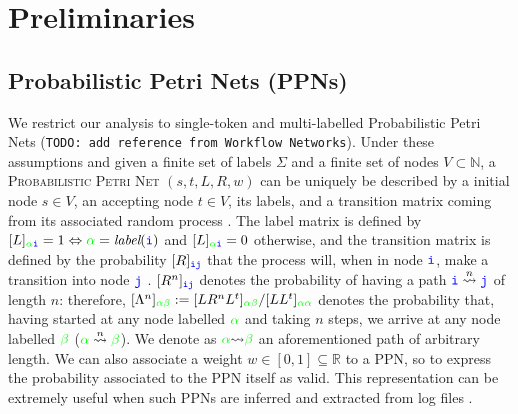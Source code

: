 \section{Preliminaries}
\subsection{Probabilistic Petri Nets (PPNs)}\label{subsec:ppn}
We restrict our analysis to single-token and multi-labelled Probabilistic Petri Nets (\texttt{\color{red}TODO: add reference from Workflow Networks}). Under these assumptions and given a finite set of labels $\Sigma$ and a finite set of nodes $V\subset \mathbb{N}$,  a \textsc{Probabilistic Petri Net} $(s,t,L,R,w)$ can be uniquely be described by a initial node $s\in V$, an accepting node $t\in V$, its labels, and a transition matrix coming from its associated random process \cite{GartnerFW03}. The label matrix is defined by $[L]_{{\color{green}\alpha}\texttt{\color{blue}i}}=1\Leftrightarrow {\color{green}\alpha}=\textit{label}(\texttt{\color{blue}i})$ and $[L]_{{\color{green}\alpha}\texttt{\color{blue}i}}=0$ otherwise, and the transition matrix is defined by the probability $[R]_{\texttt{\color{blue}ij}}$ that the process will, when in node $\texttt{\color{blue}i}$, make a transition into node $\texttt{\color{blue}j}$ \cite{Prob}. $[R^n]_{\texttt{\color{blue}ij}}$ denotes the probability of having a path $\texttt{\color{blue}i}\overset{n}{\rightsquigarrow}\texttt{\color{blue}j}$ of length $n$: therefore, $[\Lambda^n]_{\color{green}\alpha\beta}:=[LR^nL^t]_{\color{green}\alpha\beta}/[LL^t]_{\color{green}\alpha\alpha}$ denotes the probability that, having started at any node labelled $\color{green}\alpha$ and taking $n$ steps, we arrive at any node labelled $\color{green}\beta$ (${\color{green}\alpha}\overset{n}{\rightsquigarrow}{\color{green}\beta}$). We denote as ${\color{green}\alpha}{\rightsquigarrow}{\color{green}\beta}$ an aforementioned path of arbitrary length. 
We can also associate a weight $w\in[0,1]\subseteq\mathbb{R}$ to a PPN, so to express the probability associated to the PPN itself as valid. This representation can be extremely useful when such PPNs are inferred and extracted from log files \cite{PPNFromLog}.

